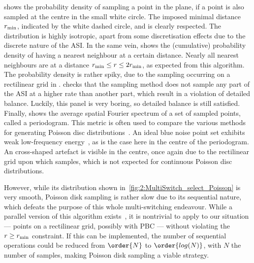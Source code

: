 shows the probability density of sampling a point in the plane, if a point is also sampled at the centre in the small white circle.
The imposed minimal distance $r_\mathrm{min}$, indicated by the white dashed circle, and is clearly respected.
The distribution is highly isotropic, apart from some discretisation effects due to the discrete nature of the ASI.
In the same vein,  shows the (cumulative) probability density of having a nearest neighbour at a certain distance.
Nearly all nearest neighbours are at a distance $r_\mathrm{min} \leq r \leq 2r_\mathrm{min}$, as expected from this algorithm.
The probability density is rather spiky, due to the sampling occurring on a rectilinear grid in \hotspice.
 checks that the sampling method does not sample any part of the ASI at a higher rate than another part, which result in a violation of detailed balance.
Luckily, this panel is very boring, so detailed balance is still satisfied.
Finally,  shows the average spatial Fourier spectrum of a set of sampled points, called a periodogram.
This metric is often used to compare the various methods for generating Poisson disc distributions~\cite{PoissonDiskComparison}.
An ideal blue noise point set exhibits weak low-frequency energy~\cite{EfficientBlueNoisePointSets}, as is the case here in the centre of the periodogram.
An cross-shaped artefact is visible in the centre, once again due to the rectilinear grid upon which \hotspice samples, which is not expected for continuous Poisson disc distributions. \par
However, while its distribution shown in~\cref{fig:2:MultiSwitch_select_Poisson} is very smooth, Poisson disk sampling is rather slow due to its sequential nature, which defeats the purpose of this whole multi-switching endeavour.
While a parallel version of this algorithm exists~\cite{PoissonDiskParallel}, it is nontrivial to apply to our situation --- points on a rectilinear grid, possibly with PBC --- without violating the $r \geq r_\mathrm{min}$ constraint. %
If this can be implemented, the number of sequential operations could be reduced from $\order{N}$ to $\order{log(N)}$, with $N$ the number of samples, making Poisson disk sampling a viable strategy.

